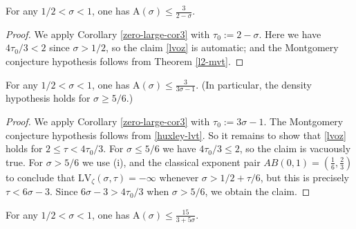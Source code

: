 \documentclass[a4paper, 10pt]{amsart}
\newcommand{\LV}{\mathrm{LV}}
\newcommand{\A}{\mathrm{A}}
\begin{document}
\begin{theorem}\label{thm:ingham_zero_density2}\cite{ingham_estimation_1940} For any $1/2 < \sigma < 1$, one has $\A(\sigma) \leq \frac{3}{2-\sigma}$.
\end{theorem}

\begin{proof}
We apply Corollary \ref{zero-large-cor3} with $\tau_0 := 2-\sigma$.  Here we have $4\tau_0/3 < 2$ since $\sigma>1/2$, so the claim \eqref{lvoz} is automatic; and the Montgomery conjecture hypothesis follows from Theorem \ref{l2-mvt}.
\end{proof}

\begin{theorem}\label{huxley-bound}\cite{Huxley} For any $1/2 < \sigma < 1$, one has $\A(\sigma) \leq \frac{3}{3\sigma-1}$. (In particular, the density hypothesis holds for $\sigma \geq 5/6$.)
\end{theorem}

\begin{proof} We apply Corollary \ref{zero-large-cor3} with $\tau_0 := 3\sigma-1$.  The Montgomery conjecture hypothesis follows from \eqref{huxley-lvt}. So it remains to show that \eqref{lvoz} holds for $2 \leq \tau < 4\tau_0/3$.  For $\sigma \leq 5/6$ we have $4\tau_0/3 \leq 2$, so the claim is vacuously true.  For $\sigma > 5/6$ we use (i),  and the classical exponent pair $AB(0,1) = (\frac{1}{6},\frac{2}{3})$ to conclude that
$\LV_\zeta(\sigma,\tau) = -\infty$ whenever $\sigma > 1/2 + \tau/6$, but this is precisely $\tau < 6\sigma - 3$.  Since $6\sigma-3 > 4\tau_0/3$ when $\sigma > 5/6$, we obtain the claim.
\end{proof}

\begin{theorem}\label{guth-maynard-density} For any $1/2 < \sigma < 1$, one has $\A(\sigma) \leq \frac{15}{3+5\sigma}$.
\end{theorem}
\end{document}
